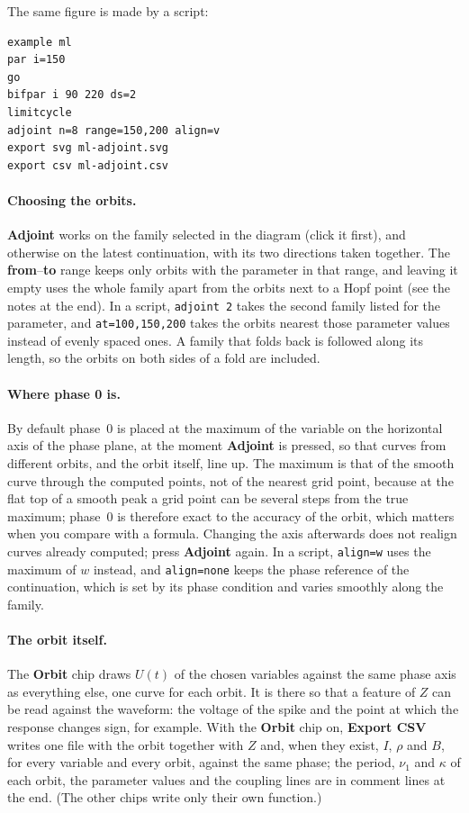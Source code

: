 \documentclass[11pt,a4paper]{article}
\newcommand{\ui}[1]{\textsf{\textbf{#1}}}          %
\begin{document}
\noindent The same figure is made by a script:\label{lst:adjscript}
\begin{lstlisting}
example ml
par i=150
go
bifpar i 90 220 ds=2
limitcycle
adjoint n=8 range=150,200 align=v
export svg ml-adjoint.svg
export csv ml-adjoint.csv
\end{lstlisting}

\paragraph{Choosing the orbits.} \ui{Adjoint} works on the family selected in the diagram (click it first), and otherwise on the latest continuation, with its two directions taken together. The \ui{from}--\ui{to} range keeps only orbits with the parameter in that range, and leaving it empty uses the whole family apart from the orbits next to a Hopf point (see the notes at the end). In a script, \texttt{adjoint 2} takes the second family listed for the parameter, and \texttt{at=100,150,200} takes the orbits nearest those parameter values instead of evenly spaced ones. A family that folds back is followed along its length, so the orbits on both sides of a fold are included.

\paragraph{Where phase 0 is.} By default phase~0 is placed at the maximum of the variable on the horizontal axis of the phase plane, at the moment \ui{Adjoint} is pressed, so that curves from different orbits, and the orbit itself, line up. The maximum is that of the smooth curve through the computed points, not of the nearest grid point, because at the flat top of a smooth peak a grid point can be several steps from the true maximum; phase~0 is therefore exact to the accuracy of the orbit, which matters when you compare with a formula. Changing the axis afterwards does not realign curves already computed; press \ui{Adjoint} again. In a script, \texttt{align=w} uses the maximum of $w$ instead, and \texttt{align=none} keeps the phase reference of the continuation, which is set by its phase condition and varies smoothly along the family.

\paragraph{The orbit itself.} The \ui{Orbit} chip draws $U(t)$ of the chosen variables against the same phase axis as everything else, one curve for each orbit. It is there so that a feature of $Z$ can be read against the waveform: the voltage of the spike and the point at which the response changes sign, for example. With the \ui{Orbit} chip on, \ui{Export CSV} writes one file with the orbit together with $Z$ and, when they exist, $I$, $\rho$ and $B$, for every variable and every orbit, against the same phase; the period, $\nu_1$ and $\kappa$ of each orbit, the parameter values and the coupling lines are in comment lines at the end. (The other chips write only their own function.)
\end{document}
